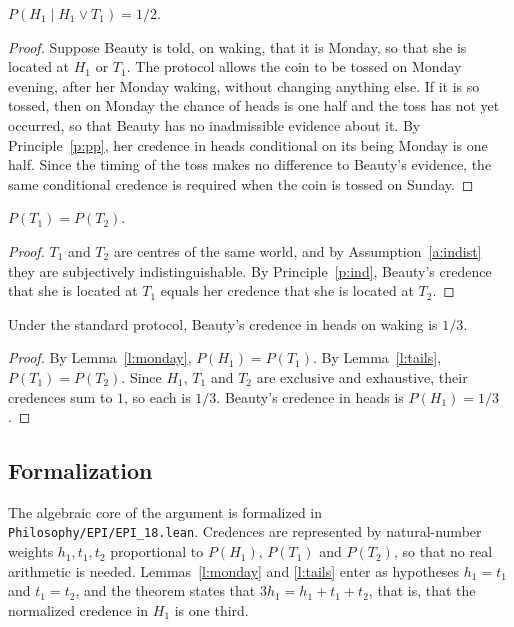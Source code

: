 \documentclass{situationist-preprint}
\begin{document}
\begin{lemma}\label{l:monday}
$P(H_1 \mid H_1 \vee T_1) = 1/2$.
\end{lemma}

\begin{proof}
Suppose Beauty is told, on waking, that it is Monday, so that she is located at $H_1$ or $T_1$. The protocol allows the coin to be tossed on Monday evening, after her Monday waking, without changing anything else. If it is so tossed, then on Monday the chance of heads is one half and the toss has not yet occurred, so that Beauty has no inadmissible evidence about it. By Principle~\ref{p:pp}, her credence in heads conditional on its being Monday is one half. Since the timing of the toss makes no difference to Beauty's evidence, the same conditional credence is required when the coin is tossed on Sunday.
\end{proof}

\begin{lemma}\label{l:tails}
$P(T_1) = P(T_2)$.
\end{lemma}

\begin{proof}
$T_1$ and $T_2$ are centres of the same world, and by Assumption~\ref{a:indist} they are subjectively indistinguishable. By Principle~\ref{p:ind}, Beauty's credence that she is located at $T_1$ equals her credence that she is located at $T_2$.
\end{proof}

\begin{theorem}\label{t:main}
Under the standard protocol, Beauty's credence in heads on waking is $1/3$.
\end{theorem}

\begin{proof}
By Lemma~\ref{l:monday}, $P(H_1) = P(T_1)$. By Lemma~\ref{l:tails}, $P(T_1) = P(T_2)$. Since $H_1$, $T_1$ and $T_2$ are exclusive and exhaustive, their credences sum to $1$, so each is $1/3$. Beauty's credence in heads is $P(H_1) = 1/3$.
\end{proof}

\subsection{Formalization}

The algebraic core of the argument is formalized in \nolinkurl{Philosophy/EPI/EPI_18.lean}. Credences are represented by natural-number weights $h_1, t_1, t_2$ proportional to $P(H_1)$, $P(T_1)$ and $P(T_2)$, so that no real arithmetic is needed. Lemmas~\ref{l:monday} and \ref{l:tails} enter as hypotheses $h_1 = t_1$ and $t_1 = t_2$, and the theorem states that $3h_1 = h_1 + t_1 + t_2$, that is, that the normalized credence in $H_1$ is one third.
\end{document}
